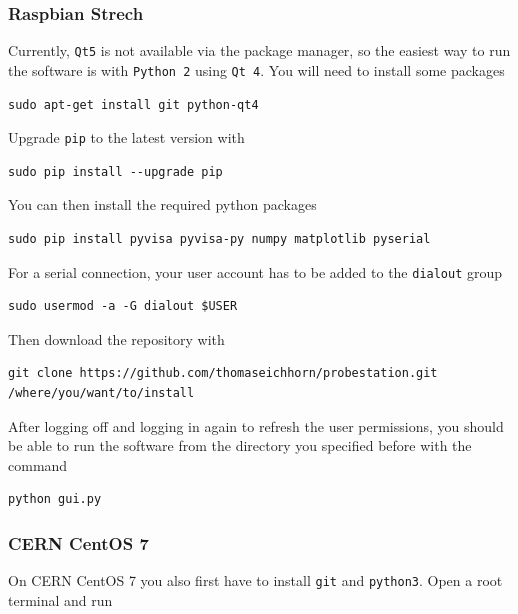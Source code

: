 \documentclass[a4paper]{article}
\begin{document}
\subsubsection{Raspbian Strech}

Currently, {\tt Qt5} is not available via the package manager, so the easiest way to run the software is with {\tt Python 2} using {\tt Qt 4}.
You will need to install some packages

\medskip
\begin{lstlisting}
sudo apt-get install git python-qt4
\end{lstlisting}
\medskip

Upgrade {\tt pip} to the latest version with

\medskip
\begin{lstlisting}
sudo pip install --upgrade pip
\end{lstlisting}
\medskip

You can then install the required python packages

\medskip
\begin{lstlisting}
sudo pip install pyvisa pyvisa-py numpy matplotlib pyserial
\end{lstlisting}
\medskip

For a serial connection, your user account has to be added to the {\tt dialout} group

\medskip
\begin{lstlisting}
sudo usermod -a -G dialout $USER
\end{lstlisting}
\medskip

Then download the repository with

\medskip
\begin{lstlisting}
git clone https://github.com/thomaseichhorn/probestation.git /where/you/want/to/install
\end{lstlisting}
\medskip

After logging off and logging in again to refresh the user permissions, you should be able to run the software from the directory you specified before with the command

\medskip
\begin{lstlisting}
python gui.py
\end{lstlisting}
\medskip

\subsubsection{CERN CentOS 7}

On CERN CentOS 7 you also first have to install {\tt git} and {\tt python3}.
Open a root terminal and run
\end{document}
